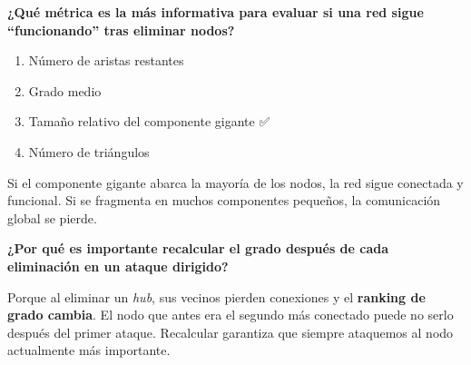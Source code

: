 \documentclass[
  letterpaper,
  DIV=11,
  numbers=noendperiod]{scrreprt}
\providecommand{\tightlist}{%
  \setlength{\itemsep}{0pt}\setlength{\parskip}{0pt}}
\begin{document}
\begin{tcolorbox}[enhanced jigsaw, toprule=.15mm, colframe=quarto-callout-caution-color-frame, coltitle=black, titlerule=0mm, colback=white, breakable, leftrule=.75mm, arc=.35mm, bottomtitle=1mm, toptitle=1mm, rightrule=.15mm, bottomrule=.15mm, left=2mm, title=\textcolor{quarto-callout-caution-color}{\faFire}\hspace{0.5em}{Pregunta 3}, colbacktitle=quarto-callout-caution-color!10!white, opacityback=0, opacitybacktitle=0.6]

\textbf{¿Qué métrica es la más informativa para evaluar si una red sigue
``funcionando'' tras eliminar nodos?}

\begin{enumerate}
\def\labelenumi{\alph{enumi})}
\tightlist
\item
  Número de aristas restantes
\item
  Grado medio
\item
  Tamaño relativo del componente gigante ✅
\item
  Número de triángulos
\end{enumerate}

Si el componente gigante abarca la mayoría de los nodos, la red sigue
conectada y funcional. Si se fragmenta en muchos componentes pequeños,
la comunicación global se pierde.

\end{tcolorbox}

\begin{tcolorbox}[enhanced jigsaw, toprule=.15mm, colframe=quarto-callout-caution-color-frame, coltitle=black, titlerule=0mm, colback=white, breakable, leftrule=.75mm, arc=.35mm, bottomtitle=1mm, toptitle=1mm, rightrule=.15mm, bottomrule=.15mm, left=2mm, title=\textcolor{quarto-callout-caution-color}{\faFire}\hspace{0.5em}{Pregunta 4}, colbacktitle=quarto-callout-caution-color!10!white, opacityback=0, opacitybacktitle=0.6]

\textbf{¿Por qué es importante recalcular el grado después de cada
eliminación en un ataque dirigido?}

Porque al eliminar un \emph{hub}, sus vecinos pierden conexiones y el
\textbf{ranking de grado cambia}. El nodo que antes era el segundo más
conectado puede no serlo después del primer ataque. Recalcular garantiza
que siempre ataquemos al nodo actualmente más importante.

\end{tcolorbox}
\end{document}
